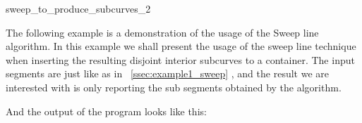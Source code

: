 \begin{ccRefFunction}[CGAL::]{sweep_to_produce_subcurves_2}


\ccExample
\label{ssec:example3_sweep}
The following example is a demonstration of the usage of the \ccc
{Sweep line} algorithm. In this example we shall present the usage of
the sweep line technique when inserting the resulting disjoint
interior subcurves to a container. The input segments are just like as
in ~\ref{ssec:example1_sweep} , and the result we are interested with
is only reporting the sub segments obtained by the 
algorithm.


And the output of the program looks like this:


\end{ccRefFunction}













